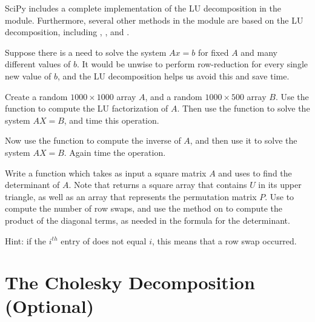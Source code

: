 SciPy includes a complete implementation of the LU decomposition in the  module. Furthermore, several other methods in the  module are based on the LU decomposition, including , , and .

\begin{problem}
\label{prob:Solve}
Suppose there is a need to solve the system $Ax = b$ for fixed $A$ and many different values of $b$. It would be unwise to perform row-reduction for every single new value of $b$, and the LU decomposition helps us avoid this and save time.

Create a random $1000 \times 1000$ array $A$, and a random $1000 \times 500$ array $B$. Use the  function to compute the LU factorization of $A$. Then use the  function to solve the system $AX = B$, and time this operation. 

Now use the  function to compute the inverse of $A$, and then use it to solve the system $AX = B$. Again time the operation. 

\end{problem}

%

\begin{problem}
\label{prob:det}
Write a function which takes as input a square matrix $A$ and uses  to find the determinant of $A$. Note that  returns a square array  that contains $U$ in its upper triangle, as well as an array  that represents the 
permutation matrix $P$. Use  to compute the number of row swaps, and use the  method on  to compute the product of the diagonal terms, as needed in the formula for the determinant.

Hint: if the $i^{th}$ entry of  does not equal $i$, this means that a row swap occurred.
\end{problem}

\section*{The Cholesky Decomposition (Optional)}


